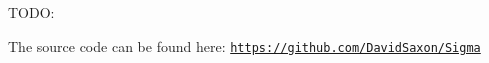 T\-O\-D\-O\-:

The source code can be found here\-: \href{https://github.com/DavidSaxon/Sigma}{\tt https\-://github.\-com/\-David\-Saxon/\-Sigma} 